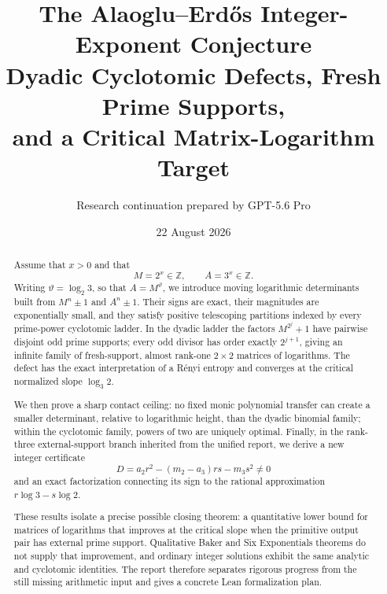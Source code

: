 \documentclass[11pt]{article}
\title{\textbf{The Alaoglu--Erd\H{o}s Integer-Exponent Conjecture}\\[0.4em]
\Large Dyadic Cyclotomic Defects, Fresh Prime Supports,\\
and a Critical Matrix-Logarithm Target}
\author{Research continuation prepared by GPT-5.6 Pro}
\date{22 August 2026}
\theoremstyle{definition}
\newcommand{\Z}{\mathbb Z}
\newcommand{\vtheta}{\vartheta}
\begin{document}
\maketitle

\begin{center}
\end{center}

\begin{abstract}
Assume that $x>0$ and that
\[
  M=2^x\in\Z,\qquad A=3^x\in\Z.
\]
Writing $\vtheta=\log_2 3$, so that $A=M^{\vtheta}$, we introduce moving
logarithmic determinants built from $M^n\pm1$ and $A^n\pm1$.  Their signs are exact,
their magnitudes are exponentially small, and they satisfy positive telescoping
partitions indexed by every prime-power cyclotomic ladder.  In the dyadic ladder the
factors $M^{2^j}+1$ have pairwise disjoint odd prime supports; every odd divisor has
order exactly $2^{j+1}$, giving an infinite family of fresh-support, almost rank-one
$2\times2$ matrices of logarithms.  The defect has the exact interpretation of a
R\'enyi entropy and converges at the critical normalized slope
$\log_3 2$.

We then prove a sharp contact ceiling: no fixed monic polynomial transfer can create a
smaller determinant, relative to logarithmic height, than the dyadic binomial family;
within the cyclotomic family, powers of two are uniquely optimal.  Finally, in the
rank-three external-support branch inherited from the unified report, we derive a new
integer certificate
\[
 D=a_2r^2-(m_2-a_3)rs-m_3s^2\ne0
\]
and an exact factorization connecting its sign to the rational approximation
$r\log3-s\log2$.

These results isolate a precise possible closing theorem: a quantitative lower bound for
matrices of logarithms that improves at the critical slope when the primitive output pair
has external prime support.  Qualitative Baker and Six Exponentials theorems do not supply
that improvement, and ordinary integer solutions exhibit the same analytic and
cyclotomic identities.  The report therefore separates rigorous progress from the still
missing arithmetic input and gives a concrete Lean formalization plan.
\end{abstract}
\end{document}
